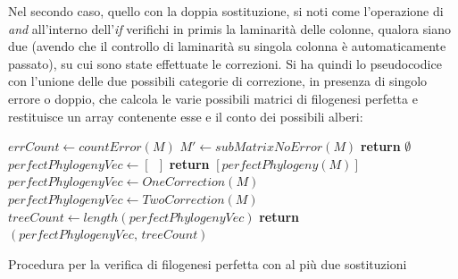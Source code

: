 \documentclass[a4paper,12pt, oneside]{book}
\begin{document}
Nel secondo caso, quello con la doppia sostituzione, si noti come l'operazione
di \textit{and} all'interno dell'\textit{if} verifichi in primis la laminarità
delle colonne, qualora siano due (avendo che il controllo di laminarità su
singola colonna è automaticamente passato), su cui sono state effettuate le
correzioni.
\newpage
\noindent
Si ha quindi lo pseudocodice con l'unione delle due possibili categorie di
correzione, in presenza di singolo errore o doppio, che calcola le varie
possibili matrici di filogenesi perfetta e restituisce un array contenente esse
e il conto dei possibili alberi:
\begin{algorithm}[H]
  \small
  \begin{algorithmic}[1]
    \State $errCount \gets countError(M)$
    \State $M'\gets subMatrixNoError(M)$
    \State \textbf{return} $\emptyset$
    \EndIf
    \State $perfectPhylogenyVec\gets[\,\,\,]$
    \State \textbf{return} $[perfectPhylogeny(M)]$
    \State $perfectPhylogenyVec\gets OneCorrection(M)$
    \Else
    \State $perfectPhylogenyVec\gets TwoCorrection(M)$
    \EndIf
    \State $treeCount \gets length(perfectPhylogenyVec)$
    \State \textbf{return} $(perfectPhylogenyVec,\,treeCount)$
    \EndFunction
  \end{algorithmic}
  \caption{Procedura per la verifica di filogenesi perfetta con al più
  due sostituzioni}
\end{algorithm}
\end{document}
